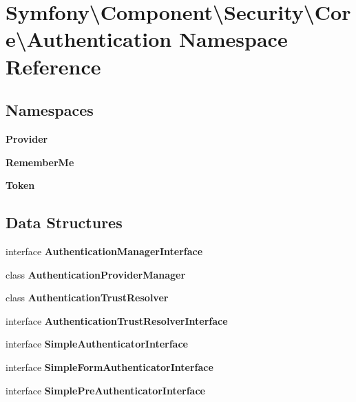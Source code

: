 \section{Symfony\textbackslash{}Component\textbackslash{}Security\textbackslash{}Core\textbackslash{}Authentication Namespace Reference}
\label{namespace_symfony_1_1_component_1_1_security_1_1_core_1_1_authentication}
\subsection*{Namespaces}
\begin{DoxyCompactItemize}
\item 
 {\bf Provider}
\item 
 {\bf Remember\+Me}
\item 
 {\bf Token}
\end{DoxyCompactItemize}
\subsection*{Data Structures}
\begin{DoxyCompactItemize}
\item 
interface {\bf Authentication\+Manager\+Interface}
\item 
class {\bf Authentication\+Provider\+Manager}
\item 
class {\bf Authentication\+Trust\+Resolver}
\item 
interface {\bf Authentication\+Trust\+Resolver\+Interface}
\item 
interface {\bf Simple\+Authenticator\+Interface}
\item 
interface {\bf Simple\+Form\+Authenticator\+Interface}
\item 
interface {\bf Simple\+Pre\+Authenticator\+Interface}
\end{DoxyCompactItemize}
